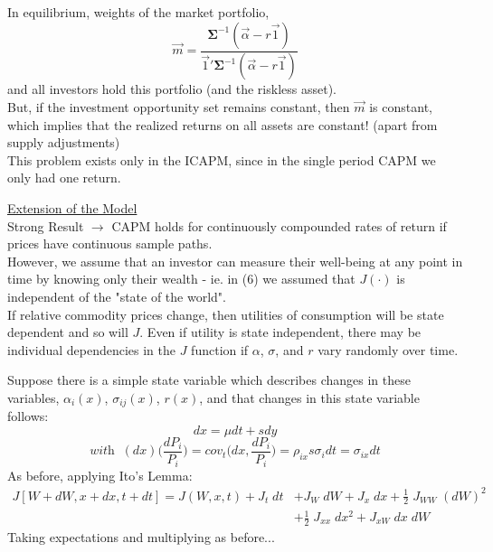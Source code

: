 \documentclass[
14pt,notheorems,hyperref={pdfauthor=whatever}
]{beamer}
\begin{document}
\begin{frame}
In equilibrium, weights of the market portfolio,\\
\[ \vec{m} = \frac{\bm{\Sigma}^{-1}(\vec{\alpha}-r\vec{1})}{\vec{1}'\bm{\Sigma}^{-1}(\vec{\alpha}-r\vec{1})} \]
and all investors hold this portfolio (and the riskless asset).\\
\hfill\break
But, if the investment opportunity set remains constant, then $\vec{m}$ is constant, which implies that the realized returns on all assets are constant! (apart from supply adjustments)\\
\hfill\break
This problem exists only in the ICAPM, since in the single period CAPM we only had one return.
\end{frame}

\begin{frame}
\underline{Extension of the Model}\\
\hfill\break
Strong Result $\longrightarrow$ CAPM holds for continuously compounded rates of return if prices have continuous sample paths.\\
\hfill\break
However, we assume that an investor can measure their well-being at any point in time by knowing only their wealth - ie. in (6) we assumed that $J(\cdot)$ is independent of the "state of the world".\\
\hfill\break
If relative commodity prices change, then utilities of consumption will be state dependent and so will $J$. Even if utility is state independent, there may be individual dependencies in the $J$ function if $\alpha$, $\sigma$, and $r$ vary randomly over time.
\end{frame}

\begin{frame}
Suppose there is a simple state variable which describes changes in these variables, $\alpha_i(x)$, $\sigma_{ij}(x)$, $r(x)$, and that changes in this state variable follows:\\
\[ dx = \mu dt + s dy \]
\[\textit{with}\;\; (dx)\bigg(\frac{dP_i}{P_i}\bigg) = cov_t\bigg(dx,\frac{dP_i}{P_i}\bigg) = \rho_{ix} s \sigma_i dt = \sigma_{ix} dt\]
As before, applying Ito's Lemma:\\
\begin{align*}
    J[W+dW, x+dx, t+dt] = J(W,x,t)+J_t\;dt &+ J_W\;dW + J_x\;dx + \frac{1}{2}\;J_{WW}\;(dW)^2\\
    &+ \frac{1}{2}\;J_{xx}\;dx^2+J_{xW}\;dx\;dW
\end{align*}
Taking expectations and multiplying as before...
\end{frame}
\end{document}
